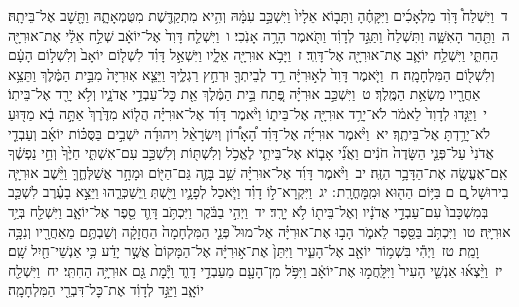 \documentclass[18pt]{article}
\newcommand{\vart}[1]{\Bfootnote{#1}}	%
\begin{document}
 {\loc ד~}וַיִּשְׁלַח֩ דָּוִ֨ד מַלְאָכִ֜ים וַיִּקָּחֶ֗הָ וַתָּב֤וֹא אֵלָיו֙ וַיִּשְׁכַּ֣ב עִמָּ֔הּ וְהִ֥יא מִתְקַדֶּ֖שֶׁת מִטֻּמְאָתָ֑הּ וַתָּ֖שׇׁב אֶל־בֵּיתָֽהּ׃ \startlock
 {\loc ה~}וַתַּ֖הַר הָאִשָּׁ֑ה וַתִּשְׁלַח֙ וַתַּגֵּ֣ד לְדָוִ֔ד וַתֹּ֖אמֶר הָרָ֥ה אָנֹֽכִי׃ \startlock
 {\loc ו~}וַיִּשְׁלַ֤ח דָּוִד֙ אֶל־יוֹאָ֔ב שְׁלַ֣ח אֵלַ֔י אֶת־אוּרִיָּ֖ה הַחִתִּ֑י וַיִּשְׁלַ֥ח יוֹאָ֛ב אֶת־אוּרִיָּ֖ה אֶל־דָּוִֽד׃ \startlock
 {\loc ז~}וַיָּבֹ֥א אוּרִיָּ֖ה אֵלָ֑יו וַיִּשְׁאַ֣ל דָּוִ֗ד לִשְׁל֤וֹם יוֹאָב֙ וְלִשְׁל֣וֹם הָעָ֔ם וְלִשְׁל֖וֹם הַמִּלְחָמָֽה׃ \startlock
 {\loc ח~}וַיֹּ֤אמֶר דָּוִד֙ לְא֣וּרִיָּ֔ה רֵ֥ד לְבֵיתְךָ֖ וּרְחַ֣ץ רַגְלֶ֑יךָ וַיֵּצֵ֤א אֽוּרִיָּה֙ מִבֵּ֣ית הַמֶּ֔לֶךְ וַתֵּצֵ֥א אַחֲרָ֖יו מַשְׂאַ֥ת הַמֶּֽלֶךְ׃ \startlock
 {\loc ט~}וַיִּשְׁכַּ֣ב אוּרִיָּ֗ה פֶּ֚תַח בֵּ֣ית הַמֶּ֔לֶךְ אֵ֖ת כׇּל־עַבְדֵ֣י אֲדֹנָ֑יו וְלֹ֥א יָרַ֖ד אֶל־בֵּיתֽוֹ׃ \startlock
 {\loc י~}וַיַּגִּ֤דוּ לְדָוִד֙ לֵאמֹ֔ר לֹא־יָרַ֥ד אוּרִיָּ֖ה אֶל־בֵּית֑וֹ וַיֹּ֨אמֶר דָּוִ֜ד אֶל־אוּרִיָּ֗ה הֲל֤וֹא מִדֶּ֙רֶךְ֙ אַתָּ֣ה בָ֔א מַדּ֖וּעַ לֹא־יָרַ֥דְתָּ אֶל־בֵּיתֶֽךָ׃ \startlock
 {\loc יא~}וַיֹּ֨אמֶר אוּרִיָּ֜ה אֶל־דָּוִ֗ד הָ֠אָר֠וֹן וְיִשְׂרָאֵ֨ל וִיהוּדָ֜ה יֹשְׁבִ֣ים בַּסֻּכּ֗וֹת  \edtext{וַאדֹנִ֨י}{\vart{א=וַאֲדֹנִ֨י | =לק ומסורת-א ובדפוסים | }}  יוֹאָ֜ב וְעַבְדֵ֤י אֲדֹנִי֙ עַל־פְּנֵ֤י הַשָּׂדֶה֙ חֹנִ֔ים וַאֲנִ֞י אָב֧וֹא אֶל־בֵּיתִ֛י לֶאֱכֹ֥ל וְלִשְׁתּ֖וֹת וְלִשְׁכַּ֣ב עִם־אִשְׁתִּ֑י חַיֶּ֙ךָ֙ וְחֵ֣י נַפְשֶׁ֔ךָ אִֽם־אֶעֱשֶׂ֖ה אֶת־הַדָּבָ֥ר הַזֶּֽה׃ \startlock
 {\loc יב~}וַיֹּ֨אמֶר דָּוִ֜ד אֶל־אוּרִיָּ֗ה שֵׁ֥ב בָּזֶ֛ה גַּם־הַיּ֖וֹם וּמָחָ֣ר אֲשַׁלְּחֶ֑ךָּ וַיֵּ֨שֶׁב אוּרִיָּ֧ה בִירוּשָׁל ַ֛͏ְם ם בַּיּ֥וֹם הַה֖וּא  וּמִֽמׇּחֳרָֽת ׃ \startlock
 {\loc יג~}וַיִּקְרָא־ל֣וֹ דָוִ֗ד וַיֹּ֧אכַל לְפָנָ֛יו וַיֵּ֖שְׁתְּ וַֽיְשַׁכְּרֵ֑הוּ וַיֵּצֵ֣א בָעֶ֗רֶב לִשְׁכַּ֤ב בְּמִשְׁכָּבוֹ֙ עִם־עַבְדֵ֣י אֲדֹנָ֔יו וְאֶל־בֵּית֖וֹ לֹ֥א יָרָֽד׃ \startlock
 {\loc יד~}וַיְהִ֣י בַבֹּ֔קֶר וַיִּכְתֹּ֥ב דָּוִ֛ד סֵ֖פֶר אֶל־יוֹאָ֑ב וַיִּשְׁלַ֖ח בְּיַ֥ד אוּרִיָּֽה׃ \startlock
 {\loc טו~}וַיִּכְתֹּ֥ב בַּסֵּ֖פֶר לֵאמֹ֑ר הָב֣וּ אֶת־אוּרִיָּ֗ה אֶל־מוּל֙ פְּנֵ֤י הַמִּלְחָמָה֙ הַחֲזָקָ֔ה וְשַׁבְתֶּ֥ם מֵאַחֲרָ֖יו וְנִכָּ֥ה וָמֵֽת׃ \startlock
 {\loc טז~}וַיְהִ֕י בִּשְׁמ֥וֹר יוֹאָ֖ב אֶל־הָעִ֑יר וַיִּתֵּן֙ אֶת־א֣וּרִיָּ֔ה אֶל־הַמָּקוֹם֙ אֲשֶׁ֣ר יָדַ֔ע כִּ֥י אַנְשֵׁי־חַ֖יִל שָֽׁם׃ \startlock
 {\loc יז~}וַיֵּ֨צְא֜וּ אַנְשֵׁ֤י הָעִיר֙ וַיִּלָּֽחֲמ֣וּ אֶת־יוֹאָ֔ב וַיִּפֹּ֥ל מִן־הָעָ֖ם מֵעַבְדֵ֣י דָוִ֑ד וַיָּ֕מׇת גַּ֖ם אוּרִיָּ֥ה הַחִתִּֽי׃ \startlock
 {\loc יח~}וַיִּשְׁלַ֖ח יוֹאָ֑ב וַיַּגֵּ֣ד לְדָוִ֔ד אֶת־כׇּל־דִּבְרֵ֖י הַמִּלְחָמָֽה׃ \startlock
\end{document}
